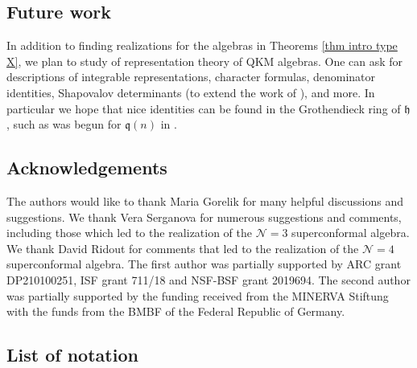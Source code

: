 \documentclass[12pt, a4paper, reqno]{amsart}
\def\NN{\mathcal{N}}
\def\q{\mathfrak{q}}
\def\h{\mathfrak{h}}
\theoremstyle{definition}
\theoremstyle{definition}
\theoremstyle{definition}
\numberwithin{theorem}{section}
\numberwithin{lemma}{section}
\numberwithin{remark}{section}
\numberwithin{definition}{section}
\numberwithin{corollary}{section}
\numberwithin{proposition}{section}
\numberwithin{example}{section}
\begin{document}
	\subsection{Future work} In addition to finding realizations for the algebras in Theorems \ref{thm intro type X}, we plan to study of representation theory of QKM algebras.  One can ask for descriptions of integrable representations, character formulas, denominator identities, Shapovalov determinants (to extend the work of \cite{G}), and more.  In particular we hope that nice identities can be found in the Grothendieck ring of $\h$, such as was begun for $\q(n)$ in \cite{GSS}.
	
	
	
	\subsection{Acknowledgements}  The authors would like to thank Maria Gorelik for many helpful discussions and suggestions.  We thank Vera Serganova for numerous suggestions and comments, including those which led to the realization of the $\NN=3$ superconformal algebra.  We thank David Ridout for comments that led to the realization of the $\NN=4$ superconformal algebra.  The first author was partially supported by ARC grant DP210100251, ISF grant 711/18 and NSF-BSF grant 2019694.  The second author was partially supported by the funding received from the MINERVA Stiftung with the funds from the BMBF of the Federal Republic of Germany.
	
	\tableofcontents
	
	
	\subsection{List of notation}
	
\end{document}
